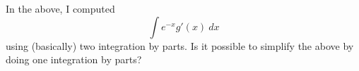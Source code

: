   In the above, I computed
  \[
  \int e^{-x} g'(x) \ dx 
  \]
  using (basically) two integration by parts.
  Is it possible to simplify the above
  by doing one integration by parts?
